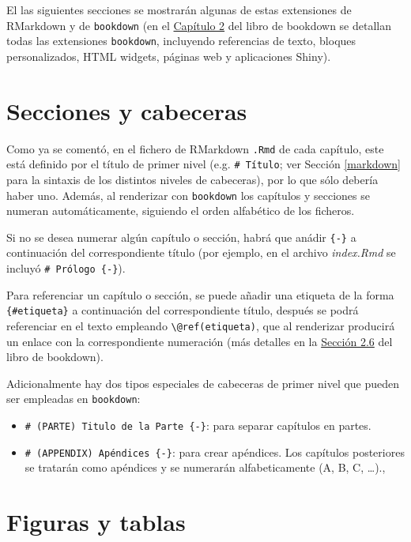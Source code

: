 \documentclass[]{book}
\theoremstyle{definition}
\theoremstyle{definition}
\theoremstyle{definition}
\theoremstyle{remark}
\begin{document}
El las siguientes secciones se mostrarán algunas de estas extensiones de
RMarkdown y de \texttt{bookdown} (en el
\href{https://bookdown.org/yihui/bookdown/markdown-extensions-by-bookdown.html}{Capítulo
2} del libro de bookdown se detallan todas las extensiones
\texttt{bookdown}, incluyendo referencias de texto, bloques
personalizados, HTML widgets, páginas web y aplicaciones Shiny).

\section{Secciones y cabeceras}\label{secciones-y-cabeceras}

Como ya se comentó, en el fichero de RMarkdown \texttt{.Rmd} de cada
capítulo, este está definido por el título de primer nivel (e.g.
\texttt{\#\ Título}; ver Sección \ref{markdown} para la sintaxis de los
distintos niveles de cabeceras), por lo que sólo debería haber uno.
Además, al renderizar con \texttt{bookdown} los capítulos y secciones se
numeran automáticamente, siguiendo el orden alfabético de los ficheros.

Si no se desea numerar algún capítulo o sección, habrá que anádir
\texttt{\{-\}} a continuación del correspondiente título (por ejemplo,
en el archivo \emph{index.Rmd} se incluyó \texttt{\#\ Prólogo\ \{-\}}).

Para referenciar un capítulo o sección, se puede añadir una etiqueta de
la forma \texttt{\{\#etiqueta\}} a continuación del correspondiente
título, después se podrá referenciar en el texto empleando
\texttt{\textbackslash{}@ref(etiqueta)}, que al renderizar producirá un
enlace con la correspondiente numeración (más detalles en la
\href{https://bookdown.org/yihui/bookdown/cross-references.html}{Sección
2.6} del libro de bookdown).

Adicionalmente hay dos tipos especiales de cabeceras de primer nivel que
pueden ser empleadas en \texttt{bookdown}:

\begin{itemize}
\item
  \texttt{\#\ (PARTE)\ Titulo\ de\ la\ Parte\ \{-\}}: para separar
  capítulos en partes.
\item
  \texttt{\#\ (APPENDIX)\ Apéndices\ \{-\}}: para crear apéndices. Los
  capítulos posteriores se tratarán como apéndices y se numerarán
  alfabeticamente (A, B, C, \ldots{}).,
\end{itemize}

\section{Figuras y tablas}\label{figuras-y-tablas}
\end{document}
